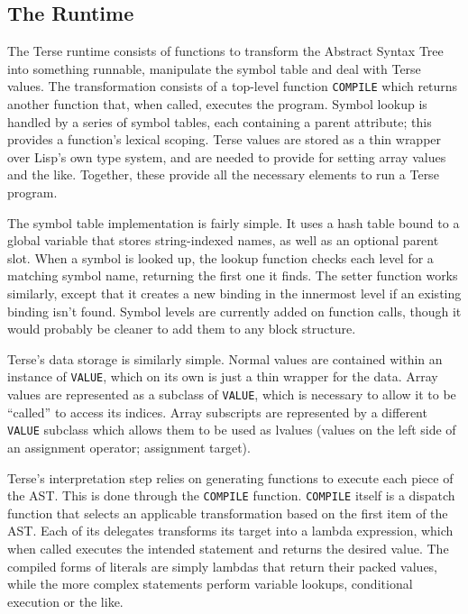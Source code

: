 \documentclass[12pt]{report}
\newcommand{\code}[1]{\texttt{#1}}
\begin{document}
\subsection*{The Runtime}

The Terse runtime consists of functions to transform the Abstract
Syntax Tree into something runnable, manipulate the symbol table and
deal with Terse values. The transformation consists of a top-level
function \code{COMPILE} which returns another function that, when
called, executes the program. Symbol lookup is handled by a series of
symbol tables, each containing a parent attribute; this provides a
function's lexical scoping. Terse values are stored as a thin wrapper
over Lisp's own type system, and are needed to provide for setting
array values and the like. Together, these provide all the necessary
elements to run a Terse program.

The symbol table implementation is fairly simple. It uses a hash table
bound to a global variable that stores string-indexed names, as well
as an optional parent slot. When a symbol is looked up, the lookup
function checks each level for a matching symbol name, returning the
first one it finds. The setter function works similarly, except that
it creates a new binding in the innermost level if an existing binding
isn't found. Symbol levels are currently added on function calls,
though it would probably be cleaner to add them to any block
structure.

Terse's data storage is similarly simple. Normal values are contained
within an instance of \code{VALUE}, which on its own is just a thin
wrapper for the data. Array values are represented as a subclass of
\code{VALUE}, which is necessary to allow it to be ``called'' to
access its indices. Array subscripts are represented by a different
\code{VALUE} subclass which allows them to be used as lvalues (values
on the left side of an assignment operator; assignment target).

Terse's interpretation step relies on generating functions to execute
each piece of the AST. This is done through the \code{COMPILE}
function. \code{COMPILE} itself is a dispatch function that selects an
applicable transformation based on the first item of the AST. Each of
its delegates transforms its target into a lambda expression, which
when called executes the intended statement and returns the desired
value. The compiled forms of literals are simply lambdas that return
their packed values, while the more complex statements perform
variable lookups, conditional execution or the like.
\end{document}
